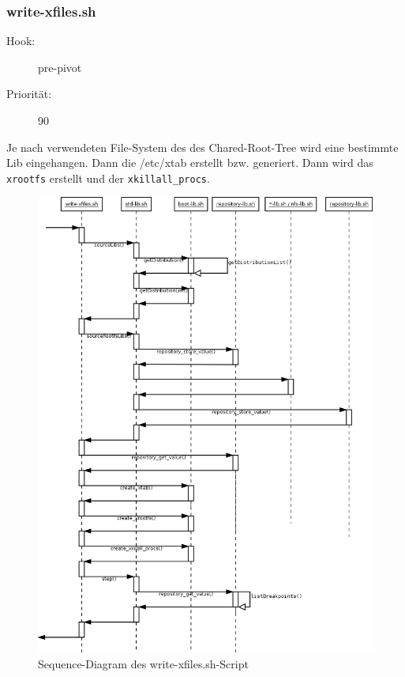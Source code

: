 \documentclass[10pt,a4paper]{article}
\begin{document}
\subsubsection{write-xfiles.sh}
\begin{description}
\item[Hook:] pre-pivot
\item[Priorität:] 90
\end{description}

Je nach verwendeten File-System des des Chared-Root-Tree wird eine bestimmte Lib eingehangen. Dann die /etc/xtab erstellt bzw.  generiert. Dann wird das \texttt{xrootfs} erstellt und der \texttt{xkillall\_procs}.

\begin{figure}[H]
 \centering
 \includegraphics[scale=0.35]{./sequence_diagram_write-xfiles_DE_de.png}
 \caption[]{Sequence-Diagram des write-xfiles.sh-Script}
\end{figure}
\end{document}
